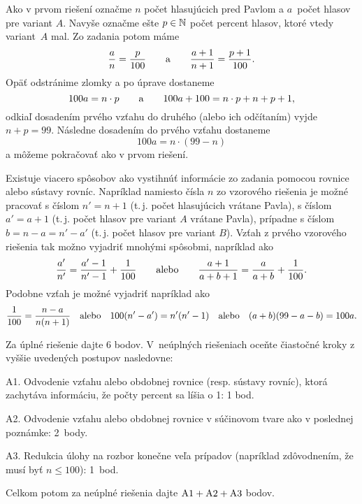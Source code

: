 {\ineriesenie
Ako v prvom riešení označme $n$ počet hlasujúcich pred Pavlom a $a$~počet hlasov pre variant $A$. Navyše označme ešte $p\in \Bbb N$ počet percent hlasov, ktoré vtedy variant~$A$ mal. Zo zadania potom máme
$$
\frac {a}{n} = \frac{p}{100} \qquad\hbox{a}\qquad \frac{a+1}{n+1}=\frac{p+1}{100}.
$$
Opäť odstránime zlomky a po úprave dostaneme
$$
100a = n\cdot p \qquad\hbox{a}\qquad 100a+100=n\cdot p + n+p+1,
$$
odkiaľ dosadením prvého vzťahu do druhého (alebo ich odčítaním) vyjde $n+p=99$.
Následne dosadením do prvého vzťahu dostaneme
$$100a=n\cdot (99-n)$$
a môžeme pokračovať ako v prvom riešení.


\poznamka
Existuje viacero spôsobov ako vystihnúť informácie zo zadania pomocou rovnice alebo sústavy rovníc. Napríklad namiesto čísla $n$ zo vzorového riešenia je možné pracovať s číslom $n'=n+1$ (t.\,j. počet hlasujúcich vrátane Pavla), s číslom $a'=a+1$ (t.\,j. počet hlasov pre variant $A$ vrátane Pavla), prípadne s číslom $b=n-a=n'-a'$ (t.\,j. počet hlasov pre variant $B$). Vzťah  z prvého vzorového riešenia tak možno vyjadriť mnohými spôsobmi, napríklad ako
$$
\frac{a'}{n'} = \frac{a'-1}{n'-1}+\frac1{100}\qquad\hbox{alebo}\qquad
\frac{a+1}{a+b+1} = \frac{a}{a+b}+\frac1{100}.
$$
Podobne vzťah  je možné vyjadriť napríklad ako
$$
\frac{1}{100}=\frac{n-a}{n(n+1)}
\quad\hbox{alebo}\quad
100(n'-a')=n'(n'-1)
\quad\hbox{alebo}\quad
(a+b)(99-a-b)=100a.
$$

\schemaABC
Za úplné riešenie dajte 6 bodov. V~neúplných riešeniach oceňte čiastočné kroky z vyššie uvedených postupov nasledovne:

\smallskip
\item{A1.} Odvodenie vzťahu  alebo obdobnej rovnice (resp. sústavy rovníc), ktorá zachytáva informáciu, že počty percent sa líšia o 1: 1 bod.
\item{A2.} Odvodenie vzťahu  alebo obdobnej rovnice v súčinovom tvare ako v poslednej poznámke: 2~body.
\item{A3.} Redukcia úlohy na rozbor konečne veľa prípadov (napríklad zdôvodnením, že musí byť $n\le 100$): 1~bod.

\smallskip\noindent
Celkom potom za neúplné riešenia dajte $\rm A1+A2+A3$ bodov.
\endschema
}

